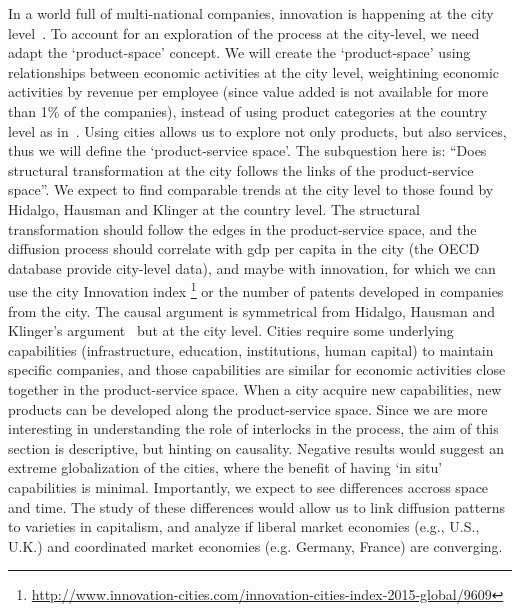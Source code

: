 In a world full of multi-national companies, innovation is happening at the city level~\citep{Belderbos2014}.
To account for an exploration of the process at the city-level, we need adapt the `product-space' concept. 
We will create the `product-space' using relationships between economic activities at the city level, weightining economic activities by revenue per employee (since value added is not available for more than 1\% of the companies),
instead of using product categories at the country level as in~\cite{hidalgo2007, hausmann2011, Hausmann2006,hidalgo2009}.
Using cities allows us to explore not only products, but also services, thus we will define the `product-service space'. 
The subquestion here is: ``Does structural transformation at the city follows the links of the product-service space''.
We expect to find comparable trends at the city level to those found by Hidalgo, Hausman and Klinger at the country level.
The structural transformation should follow the edges in the product-service space, 
and the diffusion process should correlate with gdp per capita in the city (the OECD database provide city-level data), 
and maybe with innovation, for which we can use the city Innovation index \footnote{\url{http://www.innovation-cities.com/innovation-cities-index-2015-global/9609}}
or the number of patents developed in companies from the city.
The causal argument is symmetrical from Hidalgo, Hausman and Klinger's argument~\cite{hidalgo2007, hausmann2011, Hausmann2006,hidalgo2009} but at the city level.
Cities require some underlying capabilities (infrastructure, education, institutions, human capital) to maintain specific companies,
and those capabilities are similar for economic activities close together in the product-service space.
When a city acquire new capabilities, new products can be developed along the product-service space.
Since we are more interesting in understanding the role of interlocks in the process, 
the aim of this section is descriptive, 
but hinting on causality.
Negative results would suggest an extreme globalization of the cities, 
where the benefit of having `in situ' capabilities is minimal.
Importantly, we expect to see differences accross space and time.
The study of these differences would allow us to link diffusion patterns to varieties in capitalism, 
and analyze if liberal market economies (e.g., U.S., U.K.) and coordinated market economies (e.g. Germany, France) are converging.



